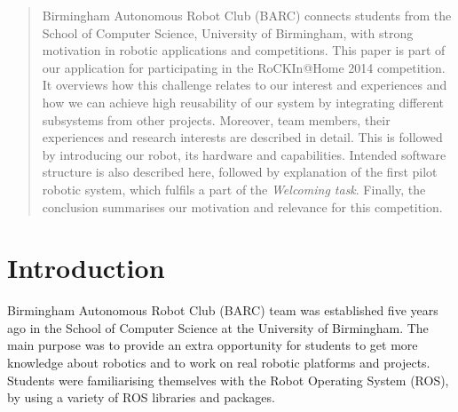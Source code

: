 \documentclass[conference]{IEEEtran}
\begin{document}
\begin{abstract}

Birmingham Autonomous Robot Club (BARC) connects students from the School of Computer Science, University of Birmingham, with strong motivation in robotic applications and competitions. This paper is part of our application for participating in the RoCKIn@Home 2014 competition. It overviews how this challenge relates to our interest and experiences and how we can achieve high reusability of our system by integrating different subsystems from other projects. Moreover, team members, their experiences and research interests are described in detail. This is followed by introducing our robot, its hardware and capabilities. Intended software structure is also described here, followed by explanation of the first pilot robotic system, which fulfils a part of the \textit{Welcoming task}. Finally, the conclusion summarises our motivation and relevance for this competition.


\end{abstract}





%
\IEEEpeerreviewmaketitle



\section{Introduction}

Birmingham Autonomous Robot Club (BARC) team was established five years ago in the School of Computer Science at the University of Birmingham. The main purpose was to provide an extra opportunity for students to get more knowledge about robotics and to work on real robotic platforms and projects. Students were familiarising themselves with the Robot Operating System (ROS), by using a variety of ROS libraries and packages.
\end{document}
